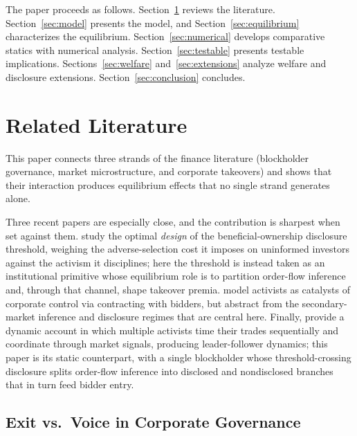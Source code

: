 \documentclass[11pt]{article}
\newcommand{\1}{\mathbf{1}}
\begin{document}
The paper proceeds as follows. Section~\ref{sec:lit} reviews the literature. Section~\ref{sec:model} presents the model, and Section~\ref{sec:equilibrium} characterizes the equilibrium. Section~\ref{sec:numerical} develops comparative statics with numerical analysis. Section~\ref{sec:testable} presents testable implications. Sections~\ref{sec:welfare} and~\ref{sec:extensions} analyze welfare and disclosure extensions. Section~\ref{sec:conclusion} concludes.
\section{Related Literature}
\label{sec:lit}

This paper connects three strands of the finance literature (blockholder governance, market microstructure, and corporate takeovers) and shows that their interaction produces equilibrium effects that no single strand generates alone.

Three recent papers are especially close, and the contribution is sharpest when set against them. \citet{OrdonezCalafiBernhardt2022} study the optimal \emph{design} of the beneficial-ownership disclosure threshold, weighing the adverse-selection cost it imposes on uninformed investors against the activism it disciplines; here the threshold is instead taken as an institutional primitive whose equilibrium role is to partition order-flow inference and, through that channel, shape takeover premia. \citet{CorumLevit2019} model activists as catalysts of corporate control via contracting with bidders, but abstract from the secondary-market inference and disclosure regimes that are central here. Finally, \citet{CetemenCisternasKolbViswanathan2026} provide a dynamic account in which multiple activists time their trades sequentially and coordinate through market signals, producing leader-follower dynamics; this paper is its static counterpart, with a single blockholder whose threshold-crossing disclosure splits order-flow inference into disclosed and nondisclosed branches that in turn feed bidder entry.

%
\subsection{Exit vs.\ Voice in Corporate Governance}
%
\end{document}
